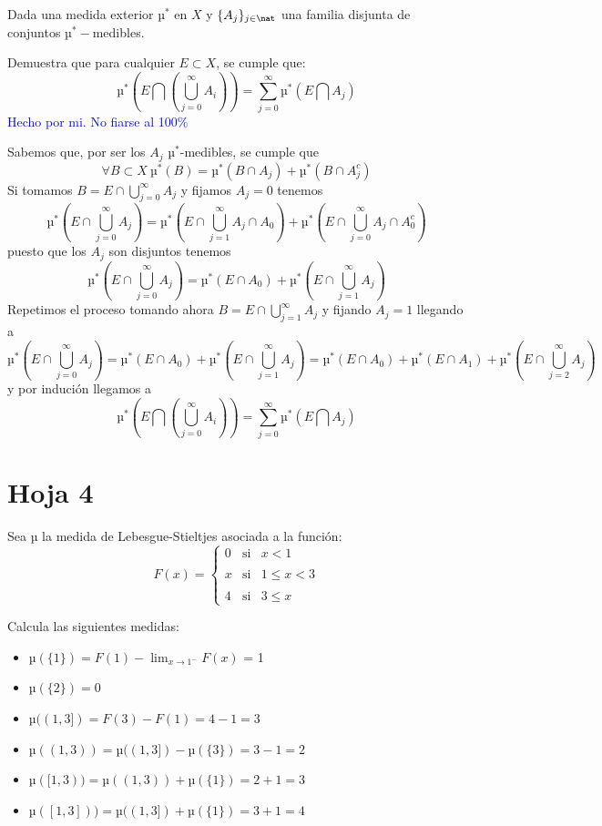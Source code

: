 \begin{problem}[17]
Dada una medida exterior $µ^*$ en $X$ y $\{A_j\}_{j \in \nat}$ una familia disjunta de conjuntos $µ^*-$medibles.

Demuestra que para cualquier $E \subset X$, se cumple que:
\[µ^*(E \bigcap (\bigcup_{j=0}^{\infty} A_i))= \sum_{j=0}^{\infty}µ^*(E \bigcap A_j)\]
\solution
\textcolor{blue}{Hecho por mi. No fiarse al 100\%}

Sabemos que, por ser los $A_j$ $µ^*$-medibles, se cumple que
\[\forall B \subset X \ µ^*(B)=µ^*(B \cap A_j) + µ^*(B \cap A_j^c)\]
Si tomamos $B=E \cap \bigcup_{j=0}^{\infty}A_j$ y fijamos $A_j=0$ tenemos
\[µ^*(E \cap \bigcup_{j=0}^{\infty}A_j)=µ^*(E \cap \bigcup_{j=1}^{\infty}A_j \cap A_0) + µ^*(E \cap \bigcup_{j=0}^{\infty}A_j \cap A_0^c)\]
puesto que los $A_j$ son disjuntos tenemos
\[µ^*(E \cap \bigcup_{j=0}^{\infty}A_j)=µ^*(E \cap A_0) + µ^*(E \cap \bigcup_{j=1}^{\infty}A_j)\]
Repetimos el proceso tomando ahora $B=E \cap \bigcup_{j=1}^{\infty}A_j$ y fijando $A_j=1$ llegando a
\[µ^*(E \cap \bigcup_{j=0}^{\infty}A_j)=µ^*(E \cap A_0) + µ^*(E \cap \bigcup_{j=1}^{\infty}A_j) = µ^*(E \cap A_0) + µ^*(E \cap A_1) + µ^*(E \cap \bigcup_{j=2}^{\infty}A_j)\]
y por indución llegamos a
\[µ^*(E \bigcap (\bigcup_{j=0}^{\infty} A_i))= \sum_{j=0}^{\infty}µ^*(E \bigcap A_j)\]
\end{problem}





\section{Hoja 4}

\begin{problem}
Sea µ la medida de Lebesgue-Stieltjes asociada a la función:
\[F(x)=\left\{ \begin{array}{lcc}
             0 &   \text{si}  & x < 1 \\
             \\ x & \text{si} & 1 \leq x < 3 \\
             \\ 4 &  \text{si}  & 3 \leq x
             \end{array}
   \right.\]

Calcula las siguientes medidas:
\solution
\begin{itemize}
\item $µ(\{1\}) = F(1)-\displaystyle\lim_{x \to 1^-} F(x)$ = 1
\item $µ(\{2\}) = 0$
\item $µ((1, 3]) = F(3)-F(1) = 4 - 1 = 3$
\item $µ((1, 3)) = µ((1, 3]) - µ(\{3\}) = 3 - 1 = 2$
\item $µ([1, 3)) = µ((1, 3)) + µ(\{1\}) = 2 + 1 = 3$
\item $µ([1, 3])) = µ((1, 3]) + µ (\{1\}) = 3 + 1 = 4$
\end{itemize}
\end{problem}

